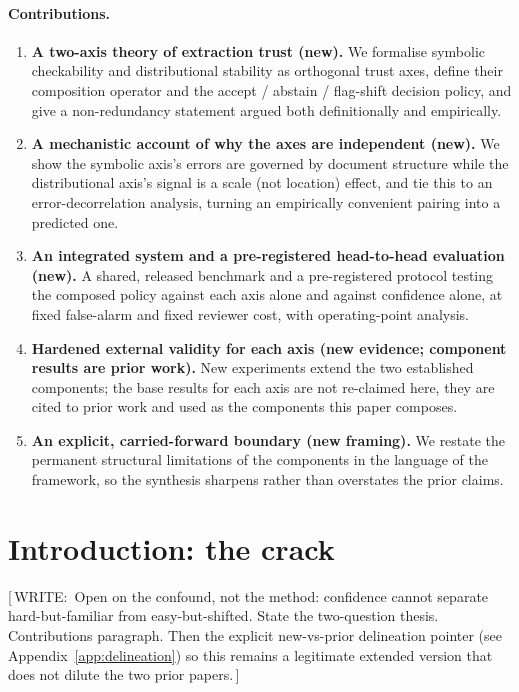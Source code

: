 \documentclass[10pt,twocolumn,a4paper]{article}
\newcommand{\todo}[1]{{\small\sffamily\color{writeclr}[\,WRITE:\ #1\,]}}
\begin{document}
\paragraph{Contributions.}
\begin{enumerate}
  \item \textbf{A two-axis theory of extraction trust (new).} We formalise
  symbolic checkability and distributional stability as orthogonal trust
  axes, define their composition operator and the accept / abstain /
  flag-shift decision policy, and give a non-redundancy statement argued both
  definitionally and empirically.
  \item \textbf{A mechanistic account of why the axes are independent
  (new).} We show the symbolic axis's errors are governed by document
  structure while the distributional axis's signal is a scale (not location)
  effect, and tie this to an error-decorrelation analysis, turning an
  empirically convenient pairing into a predicted one.
  \item \textbf{An integrated system and a pre-registered head-to-head
  evaluation (new).} A shared, released benchmark and a pre-registered
  protocol testing the composed policy against each axis alone and against
  confidence alone, at fixed false-alarm and fixed reviewer cost, with
  operating-point analysis.
  \item \textbf{Hardened external validity for each axis (new evidence;
  component results are prior work).} New experiments extend the two
  established components; the base results for each axis are not re-claimed
  here, they are cited to prior work and used as the components this paper
  composes.
  \item \textbf{An explicit, carried-forward boundary (new framing).} We
  restate the permanent structural limitations of the components in the
  language of the framework, so the synthesis sharpens rather than overstates
  the prior claims.
\end{enumerate}

\section{Introduction: the crack}
\label{sec:intro}
\todo{Open on the confound, not the method: confidence cannot separate
hard-but-familiar from easy-but-shifted. State the two-question thesis.
Contributions paragraph. Then the explicit new-vs-prior delineation pointer
(see Appendix~\ref{app:delineation}) so this remains a legitimate extended
version that does not dilute the two prior papers.}
\end{document}
